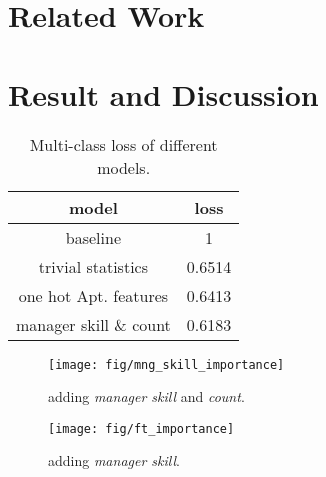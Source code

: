 \documentclass{article} %
\begin{document}
\section{Related Work}


\section{Result and Discussion}

\begin{table}[H]
	\centering
	\begin{tabular}{cc}
		model	&	loss	 \\ \hline \hline
		baseline	&	1 \\
		trivial statistics			&	0.6514 \\
		one hot Apt. features		&	0.6413 \\
		manager skill \& count		&	0.6183 \\			
	\end{tabular}
	\caption{Multi-class loss of different models.}
	\label{tab:result}
\end{table}

\begin{figure}[H]
	\centering
	\texttt{[image: fig/mng\_skill\_importance]}
	\caption{adding \textit{manager skill} and \textit{count}.}
	\label{fig:skill-rst}
\end{figure}

\begin{figure}[H]
	\centering
	\texttt{[image: fig/ft\_importance]}
	\caption{adding \textit{manager skill}.}
	\label{fig:skill-rst}
\end{figure}
\end{document}
